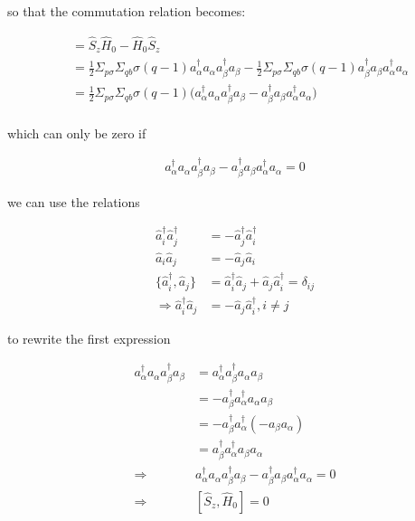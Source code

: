 \documentclass[twoside,twocolumn]{article}
\begin{document}
so that the commutation relation becomes:

\begin{align*}
[\hat{S}_z, \hat{H}_0] &= \hat{S}_z \hat{H}_0 - \hat{H}_0  \hat{S}_z \\
&= \frac{1}{2} \Sigma_{p\sigma}  \Sigma_{qb} \sigma (q-1) a_\alpha^\dagger a_\alpha  a_\beta^\dagger a_\beta - \frac{1}{2} \Sigma_{p\sigma}  \Sigma_{qb} \sigma (q-1) a_\beta^\dagger a_\beta a_\alpha^\dagger a_\alpha \\
&= \frac{1}{2} \Sigma_{p\sigma}  \Sigma_{qb} \sigma (q-1) \big( a_\alpha^\dagger a_\alpha  a_\beta^\dagger a_\beta - a_\beta^\dagger a_\beta a_\alpha^\dagger a_\alpha \big) \\
\end{align*}

which can only be zero if

\begin{align*}
a_\alpha^\dagger a_\alpha  a_\beta^\dagger a_\beta - a_\beta^\dagger a_\beta a_\alpha^\dagger a_\alpha = 0
\end{align*}

we can use the relations 

\begin{align*}
\hat{a}_i^\dag \hat{a}_j^\dag &= -\hat{a}_j^\dag \hat{a}_i^\dag \\
\hat{a}_i \hat{a}_j &= -\hat{a}_j \hat{a}_i \\
\lbrace \hat{a}_i^\dag, \hat{a}_j \rbrace &= \hat{a}_i^\dag \hat{a}_j + \hat{a}_j \hat{a}_i^\dag = \delta_{ij} \\
\Rightarrow \hat{a}_i^\dag \hat{a}_j &= -\hat{a}_j \hat{a}_i^\dag, i\neq j
\end{align*}

to rewrite the first expression

\begin{align*}
a_\alpha^\dagger a_\alpha  a_\beta^\dagger a_\beta &= a_\alpha^\dagger  a_\beta^\dagger a_\alpha  a_\beta \\
&= -a_\beta^\dagger a_\alpha^\dagger a_\alpha  a_\beta \\
&= -a_\beta^\dagger a_\alpha^\dagger (-a_\beta a_\alpha )  \\
&= a_\beta^\dagger a_\alpha^\dagger a_\beta a_\alpha \\
\Rightarrow &a_\alpha^\dagger a_\alpha  a_\beta^\dagger a_\beta - a_\beta^\dagger a_\beta a_\alpha^\dagger a_\alpha = 0 \\
\Rightarrow  &[\hat{S}_z, \hat{H}_0]  = 0
\end{align*}
\end{document}
